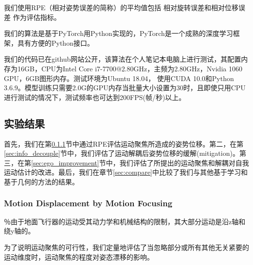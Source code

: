 {我们使用RPE（相对姿势误差的简称）的平均值包括
相对旋转误差和相对位移误差 \cite{geiger2012kitti}作为评估指标。}

{我们的算法是基于PyTorch用Python实现的，PyTorch是一个成熟的深度学习框架，具有方便的Python接口}。

我们的代码已在github网站公开，该算法在个人笔记本电脑上进行测试，其配置内存为16GB，CPU为Intel Core i7-7700@2.80GHz，主频为2.80GHz，Nvidia 1060 GPU，6GB图形内存。测试环境为Ubuntu 18.04，
使用CUDA 10.0和Python 3.6.9。模型训练只需要2.0G的GPU内存{当批量大小设置为30时}，且即使只用CPU进行测试的情况下，测试频率也可达到200FPS(帧/秒)以上。

\subsection{实验结果}

首先，我们在第\ref{sec:info_loss}节中通过RPE评估运动聚焦所造成的姿势位移。第二，在第\ref{sec:info_decouple}节中，我们评估了运动解耦后姿势位移的缓解(mitigation)。第三，在第\ref{sec:ego_improvement}节中，我们评估了所提出的运动聚焦和解耦对自我运动估计的改进。最后，我们在章节\ref{sec:compare}中比较了我们与其他基于学习和基于几何的方法的结果。
\subsubsection{Motion Displacement by Motion Focusing}
\label{sec:info_loss}

％由于地面飞行器的运动受其动力学和机械结构的限制，其大部分运动是沿z轴和绕y轴的。

为了说明运动聚焦的可行性，我们定量地评估了当忽略部分或所有其他无关紧要的运动维度时，运动聚焦的程度对姿态漂移的影响。

